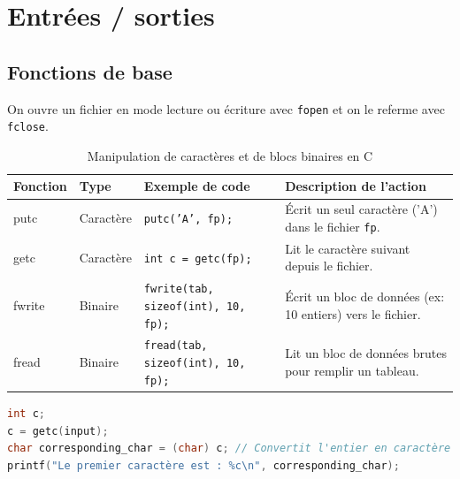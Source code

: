 \documentclass{article}
\begin{document}

\section{Entrées / sorties}
\subsection{Fonctions de base}

On ouvre un fichier en mode lecture ou écriture avec \texttt{fopen} et on le referme avec \texttt{fclose}.\\

\begin{table}[h]
\centering
\begin{tabular}{|l|l|p{5cm}|p{4.5cm}|}
\hline
\textbf{Fonction} & \textbf{Type} & \textbf{Exemple de code} & \textbf{Description de l'action} \\ \hline
putc & Caractère & \texttt{putc('A', fp);} & Écrit un seul caractère ('A') dans le fichier \texttt{fp}. \\
\hline
getc & Caractère & \texttt{int c = getc(fp);} & Lit le caractère suivant depuis le fichier. \\
\hline
fwrite & Binaire & \texttt{fwrite(tab, sizeof(int), 10, fp);} & Écrit un bloc de données (ex: 10 entiers) vers le fichier. \\
\hline
fread & Binaire & \texttt{fread(tab, sizeof(int), 10, fp);} & Lit un bloc de données brutes pour remplir un tableau. \\
\hline
\end{tabular}
\caption{Manipulation de caractères et de blocs binaires en C}
\label{tab:putc_getc_binary}
\end{table}

\begin{lstlisting}[language=C]
int c;
c = getc(input);
char corresponding_char = (char) c; // Convertit l'entier en caractère
printf("Le premier caractère est : %c\n", corresponding_char);
\end{lstlisting}

\end{document}
